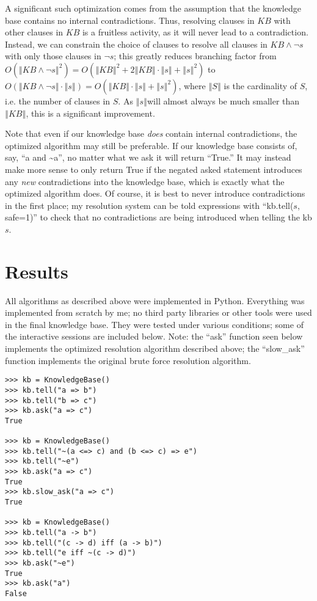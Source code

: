 \documentclass[english]{article}
\begin{document}
A significant such optimization comes from the assumption that the
knowledge base contains no internal contradictions. Thus, resolving
clauses in $KB$ with other clauses in $KB$ is a fruitless activity,
as it will never lead to a contradiction. Instead, we can constrain
the choice of clauses to resolve all clauses in $KB\land\lnot s$
with only those clauses in $\lnot s$; this greatly reduces branching
factor from $O\left(\left\Vert KB\land\lnot s\right\Vert ^{2}\right)=O\left(\left\Vert KB\right\Vert ^{2}+2\left\Vert KB\right\Vert \cdot\left\Vert s\right\Vert +\left\Vert s\right\Vert ^{2}\right)$
to $O\left(\left\Vert KB\land\lnot s\right\Vert \cdot\left\Vert s\right\Vert \right)=O\left(\left\Vert KB\right\Vert \cdot\left\Vert s\right\Vert +\left\Vert s\right\Vert ^{2}\right)$,
where $\left\Vert S\right\Vert $ is the cardinality of $S$, i.e.
the number of clauses in $S$. As $\left\Vert s\right\Vert $will
almost always be much smaller than $\left\Vert KB\right\Vert $, this
is a significant improvement. 

Note that even if our knowledge base \emph{does} contain internal
contradictions, the optimized algorithm may still be preferable. If
our knowledge base consists of, say, {}``a and \textasciitilde{}a'',
no matter what we ask it will return {}``True.'' It may instead
make more sense to only return True if the negated asked statement
introduces any \emph{new} contradictions into the knowledge base,
which is exactly what the optimized algorithm does. Of course, it
is best to never introduce contradictions in the first place; my resolution
system can be told expressions with {}``kb.tell($s$, safe=1)''
to check that no contradictions are being introduced when telling
the kb $s$.


\section{Results}

All algorithms as described above were implemented in Python. Everything
was implemented from scratch by me; no third party libraries or other
tools were used in the final knowledge base. They were tested under
various conditions; some of the interactive sessions are included
below. Note: the {}``ask'' function seen below implements the optimized
resolution algorithm described above; the {}``slow\_ask'' function
implements the original brute force resolution algorithm.


\begin{lstlisting}
>>> kb = KnowledgeBase()
>>> kb.tell("a => b")
>>> kb.tell("b => c")
>>> kb.ask("a => c")
True

>>> kb = KnowledgeBase()
>>> kb.tell("~(a <=> c) and (b <=> c) => e")
>>> kb.tell("~e")
>>> kb.ask("a => c")
True
>>> kb.slow_ask("a => c")
True

>>> kb = KnowledgeBase()
>>> kb.tell("a -> b")
>>> kb.tell("(c -> d) iff (a -> b)")
>>> kb.tell("e iff ~(c -> d)")
>>> kb.ask("~e")
True
>>> kb.ask("a")
False
\end{lstlisting}
\end{document}
